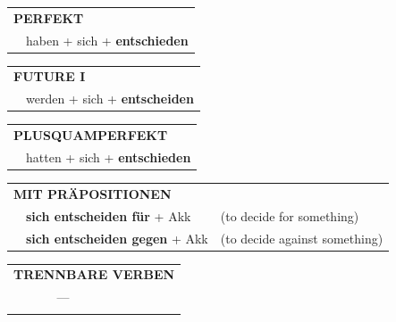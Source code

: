 \documentclass[10pt,a4paper]{revtex4-2}
\begin{document}
\begin{verbbox}
 \begin{tabular}{rl}
     \multicolumn{2}{l}{\textbf{PERFEKT}}\\
    &haben + sich + \textbf{entschieden}\\
  \end{tabular}
\hfill
   \begin{tabular}{rl}
   
    \multicolumn{2}{l}{\textbf{FUTURE I} }\\
    &werden + sich + \textbf{entscheiden}\\
 
  \end{tabular}
\hfill
   \begin{tabular}{rl}
      \multicolumn{2}{l}{\textbf{PLUSQUAMPERFEKT}}\\
    &hatten + sich + \textbf{entschieden}\\
  \end{tabular}
  
\vspace{10pt}

   \begin{tabular}{lll}
      \multicolumn{3}{l}{\textbf{MIT PRÄPOSITIONEN}}\\
& \textbf{sich entscheiden für} + Akk & (to decide for something)\\
& \textbf{sich entscheiden gegen} + Akk & (to decide against something)
  \end{tabular}
  \hfill
   \begin{tabular}{lll}
      \multicolumn{3}{l}{\textbf{TRENNBARE VERBEN}}\\
      & ---& \\
\vspace{10pt}
  \end{tabular}
  
  \vspace{-5pt}

\end{verbbox}
\end{document}
